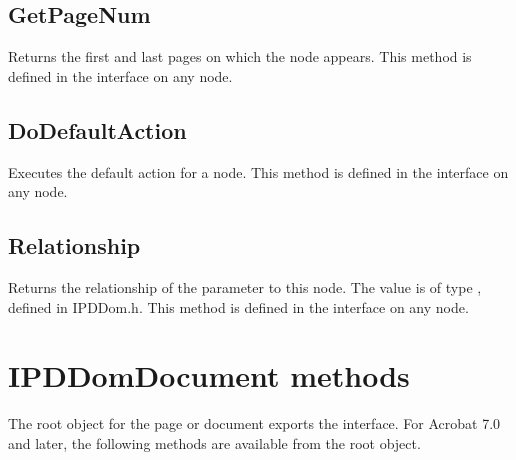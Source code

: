 \documentclass[letterpaper,12pt,english,openany,oneside]{sphinxmanual}
\begin{document}
\subsection{GetPageNum}
\label{\detokenize{Access_DOM:getpagenum}}
Returns the first and last pages on which the node appears. This method is defined in the  interface on any node.

\begin{sphinxVerbatim}[commandchars=\\\{\}]
 
 
 
\end{sphinxVerbatim}


\subsection{DoDefaultAction}
\label{\detokenize{Access_DOM:dodefaultaction}}
Executes the default action for a node. This method is defined in the  interface on any node.

\begin{sphinxVerbatim}[commandchars=\\\{\}]
 
\end{sphinxVerbatim}


\subsection{Relationship}
\label{\detokenize{Access_DOM:relationship}}
Returns the relationship of the  parameter to this node. The value is of type  , defined in IPDDom.h. This method is defined in the  interface on any node.

\begin{sphinxVerbatim}[commandchars=\\\{\}]
 
 
 
\end{sphinxVerbatim}


\section{IPDDomDocument methods}
\label{\detokenize{Access_DOM:ipddomdocument-methods}}
The root object for the page or document exports the  interface. For Acrobat 7.0 and later, the following methods are available from the root object.
\end{document}
